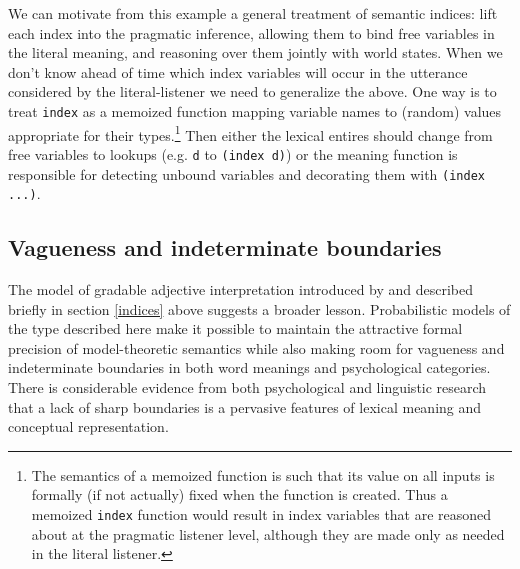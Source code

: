 \documentclass[pdfextras]{handbook}
\begin{document}
We can motivate from this example a general treatment of semantic indices: lift each index into the pragmatic inference, allowing them to bind free variables in the literal meaning, and reasoning over them jointly with world states. 
When we don't know ahead of time which index variables will occur in the utterance considered by the literal-listener we need to generalize the above. 
One way is to treat \lstinline{index} as a memoized function mapping variable names to (random) values appropriate for their types.\footnote{The semantics of a memoized function is such that its value on all inputs is formally (if not actually) fixed when the function is created. Thus a memoized \lstinline{index} function would result in index variables that are reasoned about at the pragmatic listener level, although they are made only as needed in the literal listener.} 
Then either the lexical entires should change from free variables to lookups (e.g. \lstinline{d} to \lstinline{(index d)}) or the meaning function is responsible for detecting unbound variables and decorating them with \lstinline[mathescape]{(index ...)}.

\subsection{\label{vagueness}Vagueness and indeterminate boundaries}
The model of gradable adjective interpretation introduced by \citet{lassitergoodman13} and described briefly in section \ref{indices} above suggests a broader lesson. 
Probabilistic models of the type described here make it possible to maintain the attractive formal precision of model-theoretic semantics while also making room for vagueness and indeterminate boundaries in both word meanings and psychological categories. 
There is considerable evidence from both psychological \citep[e.g.][]{rosch78,murphy02,hampton07} and linguistic \citep{taylor2003linguistic} research that a lack of sharp boundaries is a pervasive features of lexical meaning and conceptual representation. 
\end{document}
